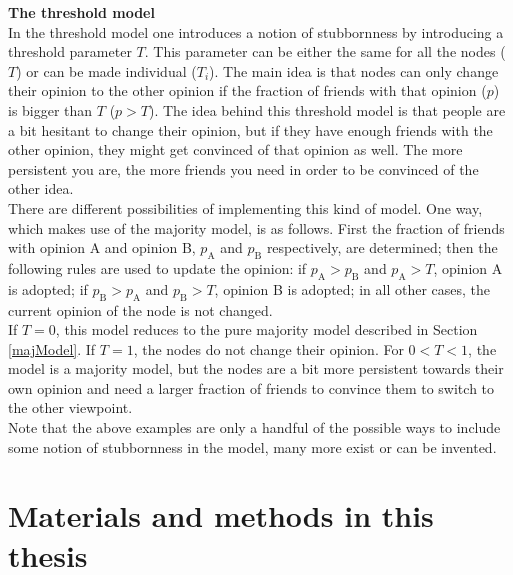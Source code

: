 \documentclass[11 pt , letterpaper , twoside , openright]{book}
\begin{document}
\newline
\textbf{The threshold model}\\
\newline
In the threshold model one introduces a notion of stubbornness by introducing a threshold parameter $T$. This parameter can be either the same for all the nodes ($T$) or can be made individual ($T_i$). The main idea is that nodes can only change their opinion to the other opinion if the fraction of friends with that opinion ($p$) is bigger than $T$ ($p > T$). The idea behind this threshold model is that people are a bit hesitant to change their opinion, but if they have enough friends with the other opinion, they might get convinced of that opinion as well. The more persistent you are, the more friends you need in order to be convinced of the other idea. \\
\newline
There are different possibilities of implementing this kind of model. One way, which makes use of the majority model, is as follows. First the fraction of friends with opinion A and opinion B, $p_\text{A}$ and $p_\text{B}$ respectively, are determined; then the following rules are used to update the opinion: if $p_\text{A} > p_\text{B}$ and $p_\text{A} > T$, opinion A is adopted; if $p_\text{B} > p_\text{A}$ and $p_\text{B} > T$, opinion B is adopted; in all other cases, the current opinion of the node is not changed.\\
\newline
If $T = 0$, this model reduces to the pure majority model described in Section \ref{majModel}. If $T = 1$, the nodes do not change their opinion. For $0 < T < 1$, the model is a majority model, but the nodes are a bit more persistent towards their own opinion and need a larger fraction of friends to convince them to switch to the other viewpoint.\\
\newline
Note that the above examples are only a handful of the possible ways to include some notion of stubbornness in the model, many more exist or can be invented.

\chapter{Materials and methods in this thesis}\label{chap4}
\end{document}

